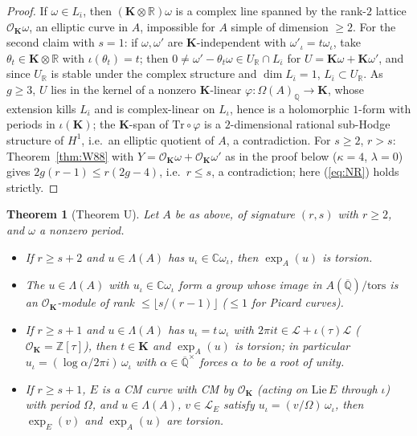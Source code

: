 \documentclass[11pt]{amsart}
\newtheorem{theorem}{Theorem}[section]
\theoremstyle{definition}
\newcommand{\Qb}{\overline{\mathbb{Q}}}
\newcommand{\C}{\mathbb{C}}
\newcommand{\Q}{\mathbb{Q}}
\newcommand{\Z}{\mathbb{Z}}
\newcommand{\R}{\mathbb{R}}
\newcommand{\Lg}{\mathcal{L}}
\begin{document}
\begin{proof}
If $\omega\in L_{\bar\iota}$, then $(\mathbf K\otimes\R)\omega$ is a complex line spanned by the rank-$2$ lattice
$\mathcal O_{\mathbf K}\omega$, an elliptic curve in $A$, impossible for $A$ simple of dimension $\ge2$. For the second claim
with $s=1$: if $\omega,\omega'$ are $\mathbf K$-independent with $\omega'_\iota=t\omega_\iota$, take $\theta_t\in\mathbf K\otimes\R$
with $\iota(\theta_t)=t$; then $0\ne\omega'-\theta_t\omega\in U_\R\cap L_{\bar\iota}$ for $U=\mathbf K\omega+\mathbf K\omega'$, and
since $U_\R$ is stable under the complex structure and $\dim L_{\bar\iota}=1$, $L_{\bar\iota}\subset U_\R$. As $g\ge3$, $U$ lies
in the kernel of a nonzero $\mathbf K$-linear $\varphi\colon\Omega(A)_\Q\to\mathbf K$, whose extension kills $L_{\bar\iota}$ and is
complex-linear on $L_\iota$, hence is a holomorphic $1$-form with periods in $\iota(\mathbf K)$; the $\mathbf K$-span of
$\mathrm{Tr}\circ\varphi$ is a $2$-dimensional rational sub-Hodge structure of $H^1$, i.e.\ an elliptic quotient of $A$, a
contradiction. For $s\ge2$, $r>s$: Theorem~\ref{thm:W88} with $Y=\mathcal O_{\mathbf K}\omega+\mathcal O_{\mathbf K}\omega'$ as in the
proof below ($\kappa=4$, $\lambda=0$) gives $2g(r-1)\le r(2g-4)$, i.e.\ $r\le s$, a contradiction; here (\ref{eq:NR}) holds
strictly.
\end{proof}

\begin{theorem}[Theorem U]\label{thm:U}
Let $A$ be as above, of signature $(r,s)$ with $r\ge2$, and $\omega$ a nonzero period.
\begin{itemize}
\item[(U1)] If $r\ge s+2$ and $u\in\Lambda(A)$ has $u_\iota\in\C\omega_\iota$, then $\exp_A(u)$ is torsion.
\item[(U2)] The $u\in\Lambda(A)$ with $u_\iota\in\C\omega_\iota$ form a group whose image in $A(\Qb)/\mathrm{tors}$ is an
$\mathcal O_{\mathbf K}$-module of rank $\le\lfloor s/(r-1)\rfloor$ ($\le1$ for Picard curves).
\item[(U3)] If $r\ge s+1$ and $u\in\Lambda(A)$ has $u_\iota=t\,\omega_\iota$ with $2\pi it\in\Lg+\iota(\tau)\Lg$
($\mathcal O_{\mathbf K}=\Z[\tau]$), then $t\in\mathbf K$ and $\exp_A(u)$ is torsion; in particular
$u_\iota=(\log\alpha/2\pi i)\,\omega_\iota$ with $\alpha\in\Qb^\times$ forces $\alpha$ to be a root of unity.
\item[(U4)] If $r\ge s+1$, $E$ is a CM curve with CM by $\mathcal O_{\mathbf K}$ (acting on $\mathrm{Lie}\,E$ through $\iota$) with
period $\Omega$, and $u\in\Lambda(A)$, $v\in\Lg_E$ satisfy $u_\iota=(v/\Omega)\,\omega_\iota$, then $\exp_E(v)$ and $\exp_A(u)$ are
torsion.
\end{itemize}
\end{theorem}
\end{document}
